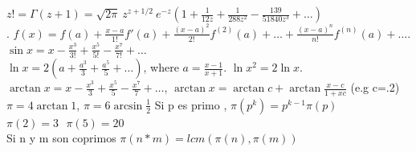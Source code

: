 $z! = \Gamma(z+1) = \sqrt{2 \pi}\ z^{z+1/2}\ e^{-z}
(1 + \frac{1}{12z} + \frac{1}{288 z^2} - \frac{139}{51840 z^3} + \dots)$ \\
.
$f(x) = f(a) + \frac{x-a}{1!} f'(a) + \frac{(x-a)^2}{2!} f^{(2)}(a) + \dots + \frac{(x-a)^n}{n!} f^{(n)}(a) + \dots$. \\
$\sin x = x - \frac{x^3}{3!} + \frac{x^5}{5!} - \frac{x^7}{7!} + \dots$ \\
$\ln x = 2(a+\frac{a^3}{3}+\frac{a^5}{5}+\dots)$, where $a=\frac{x-1}{x+1}$. $\ln x^2 = 2 \ln x$. \\
$\arctan x = x - \frac{x^3}{3} + \frac{x^5}{5} - \frac{x^7}{7} + \dots$,
$\arctan x = \arctan c + \arctan \frac{x-c}{1+xc}$ (e.g c=.2) \\
$\pi = 4 \arctan 1$, $\pi = 6 \arcsin \frac{1}{2}$ \TopicBreak
{}
Si p es primo , $ \pi(p^k) = p^{k-1}\pi(p)$\\
$\pi(2)=3 \textit{              }\pi(5)=20 $\\
Si n y m son coprimos $\pi(n*m) = lcm( \pi(n),\pi(m) )$ \\


